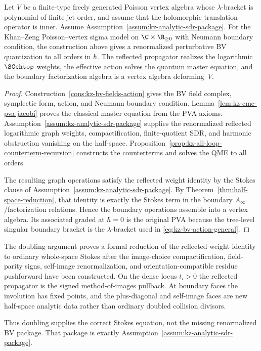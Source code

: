 \begin{theorem}
\label{thm:general-half-space-bv}
Let $V$ be a finite-type freely generated Poisson vertex algebra
whose $\lambda$-bracket is polynomial of finite jet order, and assume
that the holomorphic translation operator is inner. Assume
Assumption~\ref{assum:kz-analytic-sdr-package}. For the
Khan--Zeng Poisson--vertex sigma model on
$\C\times\R_{\ge 0}$ with Neumann boundary condition, the
construction above gives a renormalized perturbative BV quantization
to all orders in $\hbar$. The reflected propagator realizes the
logarithmic $\SCchtop$ weights, the effective action solves the
quantum master equation, and the boundary factorization algebra is a
vertex algebra deforming~$V$.
\end{theorem}

\begin{proof}
Construction~\ref{cons:kz-bv-fields-action} gives the BV field
complex, symplectic form, action, and Neumann boundary condition.
Lemma~\ref{lem:kz-cme-pva-jacobi} proves the classical master
equation from the PVA axioms.
Assumption~\ref{assum:kz-analytic-sdr-package} supplies the
renormalized reflected logarithmic graph weights, compactification,
finite-quotient SDR, and harmonic obstruction vanishing on the
half-space. Proposition~\ref{prop:kz-all-loop-counterterm-recursion}
constructs the counterterms and solves the QME to all orders.

The resulting graph operations satisfy the reflected weight identity
by the Stokes clause of
Assumption~\ref{assum:kz-analytic-sdr-package}. By
Theorem~\ref{thm:half-space-reduction}, that identity is exactly the
Stokes term in the boundary $A_\infty$/factorization relations. Hence
the boundary operations assemble into a vertex algebra. Its associated
graded at $\hbar=0$ is the original PVA because the tree-level
singular boundary bracket is the $\lambda$-bracket used in
\eqref{eq:kz-bv-action-general}.
\end{proof}

\begin{remark}
The doubling argument proves a formal reduction of the reflected
weight identity to ordinary whole-space Stokes after the
image-choice compactification, field-parity signs, self-image
renormalization, and orientation-compatible residue pushforward have
been constructed. On the dense locus $t_i>0$ the reflected propagator
is the signed method-of-images pullback. At boundary faces the
involution has fixed points, and the plus-diagonal and self-image
faces are new half-space analytic data rather than ordinary doubled
collision divisors.

Thus doubling supplies the correct Stokes equation, not the missing
renormalized BV package. That package is exactly
Assumption~\ref{assum:kz-analytic-sdr-package}.
\end{remark}

